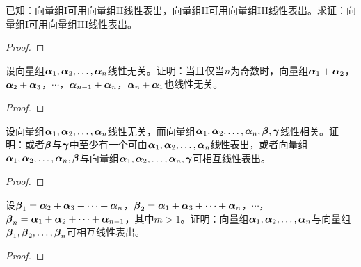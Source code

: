 \begin{problem}
已知：向量组I可用向量组II线性表出，向量组II可用向量组III线性表出。求证：向量组I可用向量组III线性表出。
\end{problem}
\begin{proof}

\end{proof}

\begin{problem}
设向量组\(\enums{\vecal}{n}\)线性无关。证明：当且仅当\(n\)为奇数时，向量组\(\vecal_1+\vecal_2\)，\(\vecal_2+\vecal_3\)，\(\cdots\)，\(\vecal_{n-1}+\vecal_n\)，\(\vecal_n+\vecal_1\)也线性无关。
\end{problem}
\begin{proof}

\end{proof}

\begin{problem}
设向量组\(\enums{\vecal}{n}\)线性无关，而向量组\(\enums{\vecal}{n},\vecbeta,\vecgamma\)线性相关。证明：或者\(\vecbeta\)与\(\vecgamma\)中至少有一个可由\(\enums{\vecal}{n}\)线性表出，或者向量组\(\enums{\vecal}{n},\vecbeta\)与向量组\(\enums{\vecal}{n},\vecgamma\)可相互线性表出。
\end{problem}
\begin{proof}

\end{proof}

\begin{problem}
设\(\vecbeta_1=\vecal_2+\vecal_3+\cdots+\vecal_{n}\)，\(\vecbeta_2=\vecal_1+\vecal_3+\cdots+\vecal_{n}\)，\(\cdots\)，\(\vecbeta_n=\vecal_1+\vecal_2+\cdots+\vecal_{n-1}\)，其中\(m>1\)。证明：向量组\(\enums{\vecal}{n}\)与向量组\(\enums{\vecbeta}{n}\)可相互线性表出。
\end{problem}
\begin{proof}

\end{proof}

